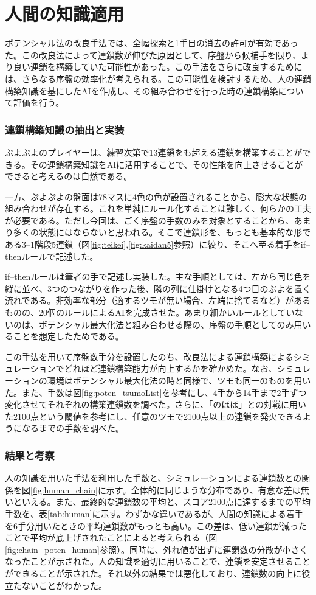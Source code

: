 \documentclass[12pt]{jarticle}
\begin{document}
\part{人間の知識適用} \setcounter{section}{0}
ポテンシャル法の改良手法では、全幅探索と1手目の消去の許可が有効であった。この改良法によって連鎖数が伸びた原因として、序盤から候補手を限り、より良い連鎖を構築していた可能性があった。この手法をさらに改良するためには、さらなる序盤の効率化が考えられる。この可能性を検討するため、人の連鎖構築知識を基にしたAIを作成し、その組み合わせを行った時の連鎖構築について評価を行う。

\section{連鎖構築知識の抽出と実装}
ぷよぷよのプレイヤーは、練習次第で13連鎖をも超える連鎖を構築することができる。その連鎖構築知識をAIに活用することで、その性能を向上させることができると考えるのは自然である。

一方、ぷよぷよの盤面は78マスに4色の色が設置されることから、膨大な状態の組み合わせが存在する。これを単純にルール化することは難しく、何らかの工夫が必要である。ただし今回は、ごく序盤の手数のみを対象とすることから、あまり多くの状態にはならないと思われる。そこで連鎖形を、もっとも基本的な形である3--1階段5連鎖（図\ref{fig:teikei},\ref{fig:kaidan5}参照）に絞り、そこへ至る着手をif--thenルールで記述した。

if--thenルールは筆者の手で記述し実装した。主な手順としては、左から同じ色を縦に並べ、3つのつながりを作った後、隣の列に仕掛けとなる4つ目のぷよを置く流れである。非効率な部分（適するツモが無い場合、左端に捨てるなど）があるものの、20個のルールによるAIを完成させた。あまり細かいルールとしていないのは、ポテンシャル最大化法と組み合わせる際の、序盤の手順としてのみ用いることを想定したためである。

この手法を用いて序盤数手分を設置したのち、改良法による連鎖構築によるシミュレーションでどれほど連鎖構築能力が向上するかを確かめた。なお、シミュレーションの環境はポテンシャル最大化法の時と同様で、ツモも同一のものを用いた。また、手数は図\ref{fig:poten_tsumoList}を参考にし、4手から14手まで2手ずつ変化させてそれぞれの構築連鎖数を調べた。さらに、「のほほ」との対戦に用いた2100点という閾値を参考にし、任意のツモで2100点以上の連鎖を発火できるようになるまでの手数を調べた。


\section{結果と考察}
人の知識を用いた手法を利用した手数と、シミュレーションによる連鎖数との関係を図\ref{fig:human_chain}に示す。全体的に同じような分布であり、有意な差は無いといえる。また、最終的な連鎖数の平均と、スコア2100点に達するまでの平均手数を、表\ref{tab:human}に示す。わずかな違いであるが、人間の知識による着手を6手分用いたときの平均連鎖数がもっとも高い。この差は、低い連鎖が減ったことで平均が底上げされたことによると考えられる（図\ref{fig:chain_poten_human}参照）。同時に、外れ値が出ずに連鎖数の分散が小さくなったことが示された。人の知識を適切に用いることで、連鎖を安定させることができることが示された。それ以外の結果では悪化しており、連鎖数の向上に役立たないことがわかった。
\end{document}
